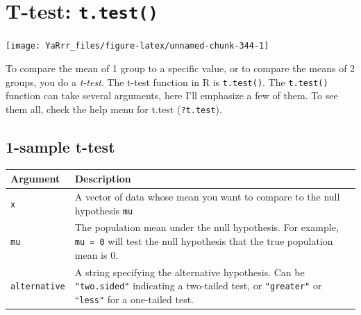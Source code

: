 \documentclass[]{book}
\theoremstyle{definition}
\theoremstyle{definition}
\theoremstyle{remark}
\begin{document}
\section{\texorpdfstring{T-test:
\texttt{t.test()}}{T-test: t.test()}}\label{t-test-t.test}

\begin{center}\texttt{[image: YaRrr\_files/figure-latex/unnamed-chunk-344-1]} \end{center}

To compare the mean of 1 group to a specific value, or to compare the
means of 2 groups, you do a \emph{t-test}. The t-test function in R is
\texttt{t.test()}. The \texttt{t.test()} function can take several
arguments, here I'll emphasize a few of them. To see them all, check the
help menu for t.test (\texttt{?t.test}).

\subsection{1-sample t-test}\label{sample-t-test}

\begin{longtable}[]{@{}ll@{}}
\toprule
\begin{minipage}[b]{0.18\columnwidth}\raggedright\strut
Argument\strut
\end{minipage} & \begin{minipage}[b]{0.67\columnwidth}\raggedright\strut
Description\strut
\end{minipage}\tabularnewline
\midrule
\endhead
\begin{minipage}[t]{0.18\columnwidth}\raggedright\strut
\texttt{x}\strut
\end{minipage} & \begin{minipage}[t]{0.67\columnwidth}\raggedright\strut
A vector of data whose mean you want to compare to the null hypothesis
\texttt{mu}\strut
\end{minipage}\tabularnewline
\begin{minipage}[t]{0.18\columnwidth}\raggedright\strut
\texttt{mu}\strut
\end{minipage} & \begin{minipage}[t]{0.67\columnwidth}\raggedright\strut
The population mean under the null hypothesis. For example,
\texttt{mu\ =\ 0} will test the null hypothesis that the true population
mean is 0.\strut
\end{minipage}\tabularnewline
\begin{minipage}[t]{0.18\columnwidth}\raggedright\strut
\texttt{alternative}\strut
\end{minipage} & \begin{minipage}[t]{0.67\columnwidth}\raggedright\strut
A string specifying the alternative hypothesis. Can be
\texttt{"two.sided"} indicating a two-tailed test, or \texttt{"greater"}
or ``\texttt{less"} for a one-tailed test.\strut
\end{minipage}\tabularnewline
\bottomrule
\end{longtable}
\end{document}
